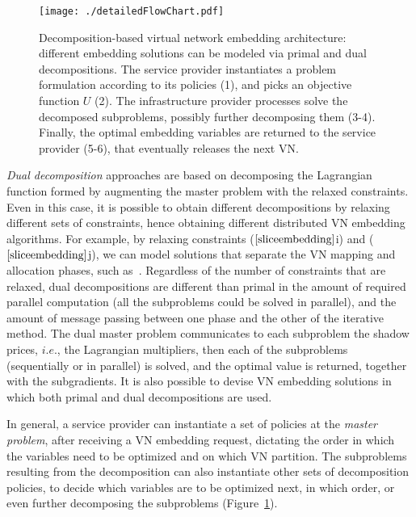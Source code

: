 \documentclass[a4paper, 10pt, conference]{ieeeconf}
\begin{document}
\begin{figure}[t!]
\centering
\texttt{[image: ./detailedFlowChart.pdf]}
\caption{Decomposition-based virtual network embedding architecture: different embedding solutions can be modeled via primal and dual decompositions. The service provider instantiates a problem formulation according to its policies (1),
and picks an objective function $U$ (2). The infrastructure provider processes solve the decomposed subproblems, possibly further decomposing them (3-4). Finally, the optimal embedding variables are returned to the service provider (5-6), that eventually releases the next VN.}
\label{fig:architecture}
\vspace{-5mm}
\end{figure}


{\it Dual decomposition} approaches are based on decomposing the Lagrangian function formed by augmenting the master problem with the relaxed constraints.
Even in this case, it is possible to obtain different decompositions by relaxing different sets of constraints, hence obtaining different distributed VN embedding algorithms.  For example, by relaxing constraints  
($\ref{sliceembedding}$i) and ($\ref{sliceembedding}$j), we can model solutions that separate the VN mapping and allocation phases, such as~\cite{SHARP,bellagio}.
Regardless of the number of constraints that are relaxed,   dual decompositions are different than primal in the amount of required parallel computation (all the subproblems could be solved in parallel), and the amount of message passing between one phase and the other of the iterative method. The dual master problem communicates to each subproblem the shadow prices, $i.e.$, the Lagrangian multipliers, then each of the subproblems (sequentially or in parallel) is solved, and  the optimal value is returned, together with the subgradients. 
It is also possible to devise VN embedding solutions in which both primal and dual decompositions are used. 

In general, a service provider can instantiate a set of policies at the {\it master problem}, after receiving a VN embedding request,  dictating the order in which the variables need to be optimized and on which VN partition. The subproblems resulting from the decomposition can also instantiate other sets of decomposition policies, to decide which variables are to be optimized next, in which order, or even further decomposing the subproblems (Figure~\ref{fig:architecture}).
\end{document}
